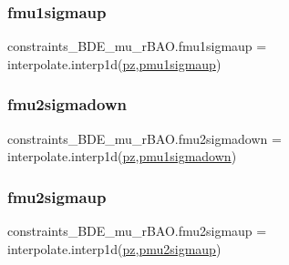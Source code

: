 \subsubsection{\texorpdfstring{fmu1sigmaup}{fmu1sigmaup}}
{\footnotesize\ttfamily constraints\+\_\+\+B\+D\+E\+\_\+mu\+\_\+r\+B\+A\+O.\+fmu1sigmaup = interpolate.\+interp1d(\mbox{\hyperlink{namespaceconstraints__BDE__mu__rBAO_adeb1878b53df598f2a0e4fa576d0ead1}{pz}},\mbox{\hyperlink{namespaceconstraints__BDE__mu__rBAO_a780984f7f51e858c3e38f0e650c93e85}{pmu1sigmaup}})}

\mbox{\label{namespaceconstraints__BDE__mu__rBAO_a52a3828ce6cc623ba6949ece84f33d22}} 
\subsubsection{\texorpdfstring{fmu2sigmadown}{fmu2sigmadown}}
{\footnotesize\ttfamily constraints\+\_\+\+B\+D\+E\+\_\+mu\+\_\+r\+B\+A\+O.\+fmu2sigmadown = interpolate.\+interp1d(\mbox{\hyperlink{namespaceconstraints__BDE__mu__rBAO_adeb1878b53df598f2a0e4fa576d0ead1}{pz}},\mbox{\hyperlink{namespaceconstraints__BDE__mu__rBAO_af34a46b04ed1b2eba4dca89e8c8eb37d}{pmu1sigmadown}})}

\mbox{\label{namespaceconstraints__BDE__mu__rBAO_a9ba176a81006e6455ae58b1d263e8076}} 
\subsubsection{\texorpdfstring{fmu2sigmaup}{fmu2sigmaup}}
{\footnotesize\ttfamily constraints\+\_\+\+B\+D\+E\+\_\+mu\+\_\+r\+B\+A\+O.\+fmu2sigmaup = interpolate.\+interp1d(\mbox{\hyperlink{namespaceconstraints__BDE__mu__rBAO_adeb1878b53df598f2a0e4fa576d0ead1}{pz}},\mbox{\hyperlink{namespaceconstraints__BDE__mu__rBAO_aa80732f50f13e322e39d3b38f112fa59}{pmu2sigmaup}})}

